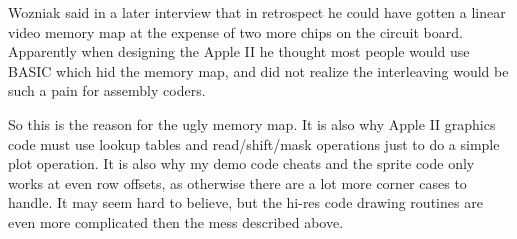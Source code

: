 \documentclass{article}
\begin{document}
%
%
%

Wozniak said in a later interview that in retrospect he could have
gotten a linear video memory map at the expense of two more chips
on the circuit board.
Apparently when designing the Apple II he thought most people would use BASIC
which hid the memory map, and did not realize the interleaving would
be such a pain for assembly coders.

So this is the reason for the ugly memory map.
It is also why Apple II graphics code must use lookup tables and
read/shift/mask operations just to do a simple plot operation.
It is also why my demo code cheats and the sprite code only works
at even row offsets, as otherwise there are a lot more corner cases
to handle.
It may seem hard to believe, but the hi-res code drawing routines
are even more complicated then the mess described above.


\end{document}
